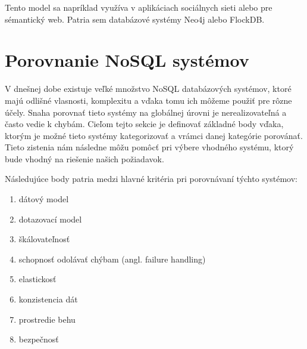 \documentclass[11pt,twoside,a4paper]{book}
\begin{document}
Tento model sa napríklad využíva v aplikáciach sociálnych sieti alebo pre sémantický web. Patria sem databázové systémy Neo4j alebo FlockDB.


\section{Porovnanie NoSQL systémov}

V dnešnej dobe existuje veľké množstvo NoSQL databázových systémov, ktoré majú odlišné vlasnosti, komplexitu a vďaka tomu ich môžeme použiť pre rôzne účely. Snaha porovnať tieto systémy na globálnej úrovni je nerealizovateľná a často vedie k chybám. Cieľom tejto sekcie je definovať základné body vďaka, ktorým je možné tieto systémy kategorizovať a vrámci danej kategórie porovánať. Tieto zistenia nám následne môžu pomôcť pri výbere vhodného systému, ktorý bude vhodný na riešenie našich požiadavok.


Následujúce body patria medzi hlavné kritéria pri porovnávaní týchto systémov:
\begin{enumerate}
 \item
  dátový model
 \item 
  dotazovací model
 \item
  škálovateľnosť
 \item 
  schopnosť odolávať chýbam (angl. failure handling)
 \item
  elastickosť
 \item 
  konzistencia dát
 \item
  prostredie behu
 \item 
  bezpečnosť 
\end{enumerate}
\end{document}
